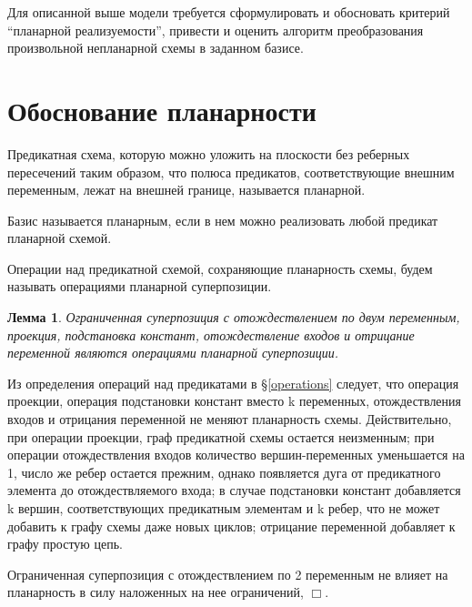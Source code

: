 \documentclass[12pt]{extarticle}
\newtheorem{lemma}[theorem]{Лемма}
\newenvironment{proof}[1][Доказательство.]{\begin{trivlist}
\item[\hskip \labelsep {\bfseries #1}]}{\end{trivlist}}
\newenvironment{definition}[1][Определение.]{\begin{trivlist}
\item[\hskip \labelsep {\bfseries #1}]}{\end{trivlist}}
\begin{document}
Для описанной выше модели требуется сформулировать и обосновать критерий ``планарной реализуемости'', привести и оценить алгоритм
преобразования произвольной непланарной схемы в заданном базисе.
\clearpage

\section{Обоснование планарности}

\begin{definition}
Предикатная схема, которую можно уложить на плоскости без реберных пересечений таким образом, что полюса предикатов, 
соответствующие внешним переменным, лежат на внешней границе, называется планарной. 
\end{definition}

\begin{definition}
Базис называется планарным, если в нем можно реализовать любой предикат планарной схемой.
\end{definition}

\begin{definition}
Операции над предикатной схемой, сохраняющие планарность схемы, будем называть операциями планарной суперпозиции.
\end{definition}

\begin{lemma}
\label{lemma_planar_ops}
Ограниченная суперпозиция с отождествлением по двум переменным, проекция,
подстановка констант, отождествление входов и отрицание переменной являются операциями планарной суперпозиции.
\end{lemma}
\begin{proof}
Из определения операций над предикатами в \S \ref{operations} следует, что операция проекции, операция подстановки
констант вместо k переменных, отождествления входов и отрицания переменной не меняют планарность схемы. 
Действительно, при операции проекции, граф предикатной схемы остается неизменным; 
при операции отождествления входов количество вершин-переменных уменьшается на 1, число же ребер остается прежним, 
однако появляется дуга от предикатного элемента до отождествляемого входа;
в случае подстановки констант добавляется k вершин, соответствующих предикатным элементам
и k ребер, что не может добавить к графу схемы даже новых циклов;
отрицание переменной добавляет к графу простую цепь. 

Ограниченная суперпозиция с отождествлением по 2 переменным не влияет на планарность в силу наложенных на
нее ограничений, 
$\Box$.
\end{proof}
\end{document}

